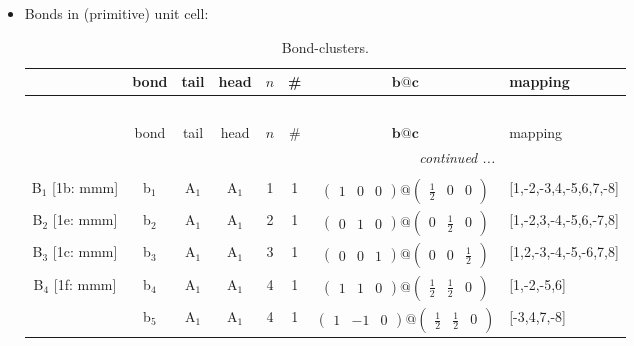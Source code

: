 \documentclass[fleqn,10pt,landscape]{article}
\begin{document}
\begin{itemize}
\item Bonds in (primitive) unit cell:
\begin{center}
\renewcommand{\arraystretch}{1.3}
\begin{longtable}{cc|cc|c|c|c|l}
\caption{Bond-clusters.}
 \\
 \hline \hline
 & bond & tail & head & $n$ & \# & $\bm{b}@\bm{c}$ & mapping \\ \hline \endfirsthead

\multicolumn{7}{l}{\tablename\ \thetable{}} \\
 \hline \hline
 & bond & tail & head & $n$ & \# & $\bm{b}@\bm{c}$ & mapping \\ \hline \endhead

 \hline \hline
\multicolumn{7}{r}{\footnotesize\it continued ...} \\ \endfoot

 \hline \hline
\multicolumn{7}{r}{} \\ \endlastfoot

B$_{1}$ [1b: mmm] & b$_{1}$ & A$_{1}$ & A$_{1}$ & 1 & 1 & $\begin{pmatrix} 1 & 0 & 0 \end{pmatrix}@\begin{pmatrix} \frac{1}{2} & 0 & 0 \end{pmatrix}$ & [1,-2,-3,4,-5,6,7,-8] \\ \hline
B$_{2}$ [1e: mmm] & b$_{2}$ & A$_{1}$ & A$_{1}$ & 2 & 1 & $\begin{pmatrix} 0 & 1 & 0 \end{pmatrix}@\begin{pmatrix} 0 & \frac{1}{2} & 0 \end{pmatrix}$ & [1,-2,3,-4,-5,6,-7,8] \\ \hline
B$_{3}$ [1c: mmm] & b$_{3}$ & A$_{1}$ & A$_{1}$ & 3 & 1 & $\begin{pmatrix} 0 & 0 & 1 \end{pmatrix}@\begin{pmatrix} 0 & 0 & \frac{1}{2} \end{pmatrix}$ & [1,2,-3,-4,-5,-6,7,8] \\ \hline
B$_{4}$ [1f: mmm] & b$_{4}$ & A$_{1}$ & A$_{1}$ & 4 & 1 & $\begin{pmatrix} 1 & 1 & 0 \end{pmatrix}@\begin{pmatrix} \frac{1}{2} & \frac{1}{2} & 0 \end{pmatrix}$ & [1,-2,-5,6] \\
& b$_{5}$ & A$_{1}$ & A$_{1}$ & 4 & 1 & $\begin{pmatrix} 1 & -1 & 0 \end{pmatrix}@\begin{pmatrix} \frac{1}{2} & \frac{1}{2} & 0 \end{pmatrix}$ & [-3,4,7,-8] \\
\end{longtable}
\end{center}


\end{itemize}
\end{document}
